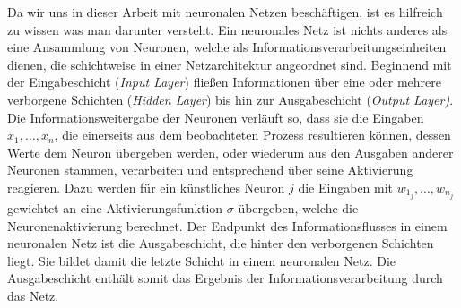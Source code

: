 Da wir uns in dieser Arbeit mit neuronalen Netzen beschäftigen, ist es hilfreich zu wissen was man darunter versteht. Ein neuronales Netz ist nichts anderes als eine Ansammlung von Neuronen, welche als Informationsverarbeitungseinheiten dienen, die schichtweise in einer Netzarchitektur angeordnet sind. Beginnend mit der Eingabeschicht (\textit{Input Layer}) fließen Informationen über eine oder mehrere verborgene Schichten (\textit{Hidden Layer}) bis hin zur Ausgabeschicht (\textit{Output Layer)}. Die Informationsweitergabe der Neuronen verläuft so, dass sie die Eingaben $x_1,\dots,x_n$, die einerseits aus dem beobachteten Prozess resultieren können, dessen Werte dem Neuron übergeben werden, oder wiederum aus den Ausgaben anderer Neuronen stammen, verarbeiten und entsprechend über seine Aktivierung reagieren. Dazu werden für ein künstliches Neuron $j$ die Eingaben mit $w_{1_j}, \dots, w_{n_j}$ gewichtet an eine Aktivierungsfunktion $\sigma$ übergeben, welche die Neuronenaktivierung berechnet. Der Endpunkt des Informationsflusses in einem neuronalen Netz ist die Ausgabeschicht, die hinter den verborgenen Schichten liegt. Sie bildet damit die letzte Schicht in einem neuronalen Netz. Die Ausgabeschicht enthält somit das Ergebnis der Informationsverarbeitung durch das Netz.  
%        
%        
